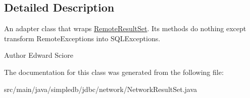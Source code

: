 \subsection{Detailed Description}
An adapter class that wraps \hyperlink{interfacesimpledb_1_1jdbc_1_1network_1_1RemoteResultSet}{Remote\+Result\+Set}. Its methods do nothing except transform Remote\+Exceptions into S\+Q\+L\+Exceptions. \begin{DoxyAuthor}{Author}
Edward Sciore 
\end{DoxyAuthor}


The documentation for this class was generated from the following file\+:\begin{DoxyCompactItemize}
\item 
src/main/java/simpledb/jdbc/network/Network\+Result\+Set.\+java\end{DoxyCompactItemize}
